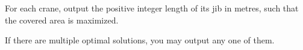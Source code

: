 
	For each crane, output the positive integer length of its jib in metres, such that the covered area is maximized.

	If there are multiple optimal solutions, you may output any one of them.

